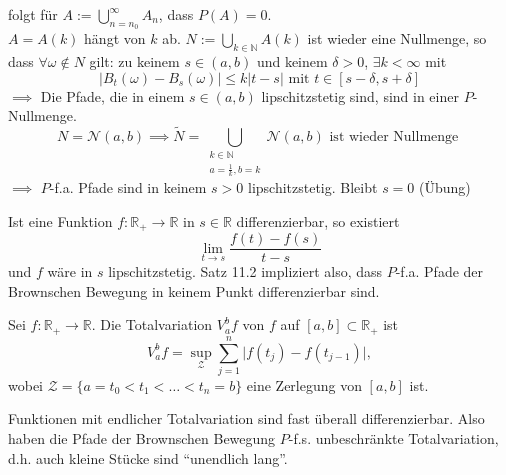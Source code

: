 \documentclass[a4paper,twoside,DIV15,BCOR12mm]{scrbook}
\begin{document}
\begin{beweis}
folgt für $A:=\bigcup_{n=n_0}^\infty A_n$, dass $P(A)=0$. \\
$A=A(k)$ hängt von $k$ ab. $N:=\bigcup_{k\in\mathbb N}A(k)$ ist wieder eine Nullmenge, so dass
$\forall \omega\notin N$ gilt: zu keinem $s\in(a,b)$ und keinem $\delta > 0$, $\exists k<\infty$ mit
\[
\vert B_t(\omega)-B_s(\omega)\vert\leq k\vert t-s\vert\text{ mit }t\in[s-\delta,s+\delta]
\]
$\implies$ Die Pfade, die in einem $s\in (a,b)$ lipschitzstetig sind, sind in einer $P$-Nullmenge. \\
 \[ 
N=\mathcal N(a,b)\implies\tilde{N}=\bigcup_{\begin{array}{c} k\in\mathbb N \\ a=\frac{1}{k},b=k \end{array}} \mathcal N(a,b)\text{ ist wieder Nullmenge }
\]
$\implies$ $P$-f.a. Pfade sind in keinem $s>0$ lipschitzstetig. Bleibt $s=0$ (Übung)  

\end{beweis}

\begin{bemerkung}
  Ist eine Funktion $f:\mathbb R_+\longrightarrow\mathbb R$ in $s\in \mathbb R$ differenzierbar, so existiert
\[
\lim_{t\rightarrow s}\frac{f(t)-f(s)}{t-s}
\]
und $f$ wäre in $s$ lipschitzstetig. Satz 11.2 impliziert also, dass $P$-f.a. Pfade der Brownschen Bewegung in keinem Punkt differenzierbar sind.
\end{bemerkung}

\begin{definition}
  Sei $f:\mathbb R_+\longrightarrow\mathbb R$. Die Totalvariation $V_a^b f$ von $f$ auf $[a,b]\subset\mathbb R_+$ ist
\[
V_a^bf=\sup_{\mathcal Z}\sum_{j=1}^n\vert f(t_j)-f(t_{j-1})\vert,
\]
wobei $\mathcal Z=\{a=t_0<t_1<\dots<t_n=b\}$ eine Zerlegung von $[a,b]$ ist.
\end{definition}

\begin{bemerkung}
  Funktionen mit endlicher Totalvariation sind fast überall differenzierbar. Also haben die Pfade der Brownschen Bewegung $P$-f.s. unbeschränkte Totalvariation, d.h. auch kleine Stücke sind ``unendlich lang''.
\end{bemerkung}
\end{document}
